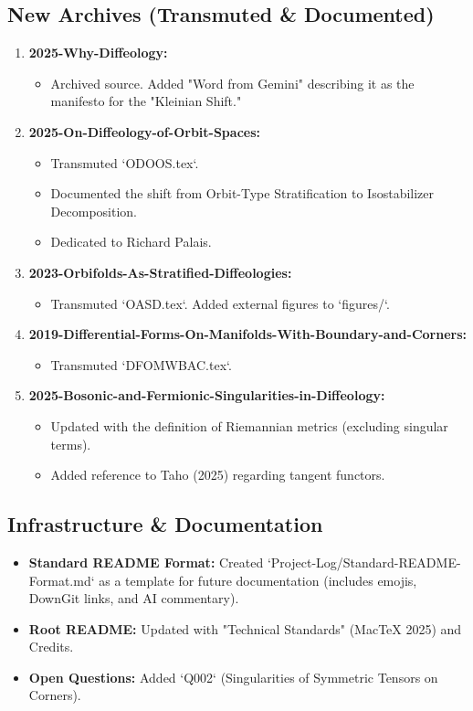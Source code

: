 \documentclass[11pt]{article}
\begin{document}
\subsection{New Archives (Transmuted \& Documented)}
\begin{enumerate}
    \item \textbf{2025-Why-Diffeology:}
    \begin{itemize}
        \item Archived source. Added "Word from Gemini" describing it as the manifesto for the "Kleinian Shift."
    \end{itemize}
    \item \textbf{2025-On-Diffeology-of-Orbit-Spaces:}
    \begin{itemize}
        \item Transmuted `ODOOS.tex`.
        \item Documented the shift from Orbit-Type Stratification to Isostabilizer Decomposition.
        \item Dedicated to Richard Palais.
    \end{itemize}
    \item \textbf{2023-Orbifolds-As-Stratified-Diffeologies:}
    \begin{itemize}
        \item Transmuted `OASD.tex`. Added external figures to `figures/`.
    \end{itemize}
    \item \textbf{2019-Differential-Forms-On-Manifolds-With-Boundary-and-Corners:}
    \begin{itemize}
        \item Transmuted `DFOMWBAC.tex`.
    \end{itemize}
    \item \textbf{2025-Bosonic-and-Fermionic-Singularities-in-Diffeology:}
    \begin{itemize}
        \item Updated with the definition of Riemannian metrics (excluding singular terms).
        \item Added reference to Taho (2025) regarding tangent functors.
    \end{itemize}
\end{enumerate}

\subsection{Infrastructure & Documentation}
\begin{itemize}
    \item \textbf{Standard README Format:} Created `Project-Log/Standard-README-Format.md` as a template for future documentation (includes emojis, DownGit links, and AI commentary).
    \item \textbf{Root README:} Updated with "Technical Standards" (MacTeX 2025) and Credits.
    \item \textbf{Open Questions:} Added `Q002` (Singularities of Symmetric Tensors on Corners).
\end{itemize}
\end{document}
